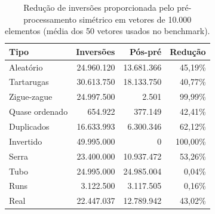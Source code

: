 \begin{table}[ht]
\centering
\caption{Redução de inversões proporcionada pelo pré-processamento simétrico em vetores de 10.000 elementos (média dos 50 vetores usados no benchmark).}
\label{tab:inversoes}
\begin{tabular}{lrrr}
\hline
\textbf{Tipo} & \textbf{Inversões} & \textbf{Pós-pré} & \textbf{Redução} \\
\hline
Aleatório & 24.960.120 & 13.681.366 & 45,19\% \\
Tartarugas & 30.613.750 & 18.133.750 & 40,77\% \\
Zigue-zague & 24.997.500 & 2.501 & 99,99\% \\
Quase ordenado & 654.922 & 377.149 & 42,41\% \\
Duplicados & 16.633.993 & 6.300.346 & 62,12\% \\
Invertido & 49.995.000 & 0 & 100,00\% \\
Serra & 23.400.000 & 10.937.472 & 53,26\% \\
Tubo & 24.995.000 & 24.985.004 & 0,04\% \\
Runs & 3.122.500 & 3.117.505 & 0,16\% \\
Real & 22.447.037 & 12.789.942 & 43,02\% \\
\hline
\end{tabular}
\end{table}
